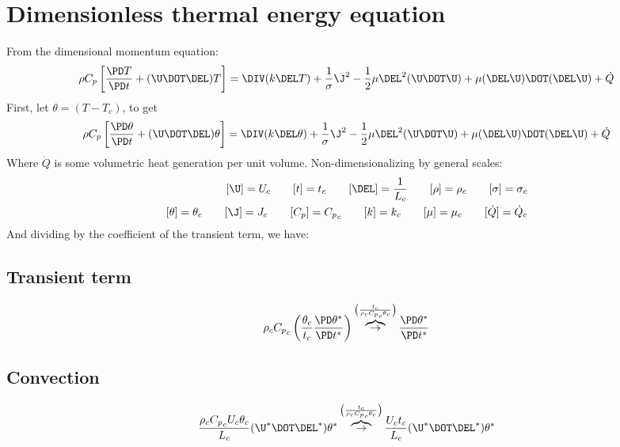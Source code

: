 \documentclass[11pt]{article}
\newcommand{\OB}{\overbrace{\rightarrow}^{\left(\frac{t_c}{\rho_c {C_p}_c \theta_c}\right)}}
\newcommand{\Cp}{{C_p}_c}
\begin{document}
\doublespacing
\MOONSTITLE
\maketitle

\section{Dimensionless thermal energy equation}
From the dimensional momentum equation:
\begin{equation}
	\rho C_p \left[ \frac{\PD T}{\PD t}
	+ (\U \DOT \DEL) T \right]
	= \DIV (k \DEL T)
	+ \frac{1}{\sigma} \J^2
	- \frac{1}{2} \mu \DEL^2 (\U \DOT \U)
	+ \mu (\DEL \U) \DOT (\DEL \U)
	+ \dot{Q}
\end{equation}
First, let $\theta = (T - T_c)$, to get
\begin{equation}
	\rho C_p \left[ \frac{\PD \theta}{\PD t}
	+ (\U \DOT \DEL) \theta \right]
	= \DIV (k \DEL \theta)
	+ \frac{1}{\sigma} \J^2
	- \frac{1}{2} \mu \DEL^2 (\U \DOT \U)
	+ \mu (\DEL \U) \DOT (\DEL \U)
	+ \dot{Q}
\end{equation}
Where $\dot{Q}$ is some volumetric heat generation per unit volume. Non-dimensionalizing by general scales:
\begin{equation}\begin{aligned}
	[\U] = U_c \qquad
	[t] = t_c \qquad
	[\DEL] = \frac{1}{L_c} \qquad
	[\rho] = \rho_c \qquad
	[\sigma] = \sigma_c \\
	[\theta] = \theta_c \qquad
	[\J] = J_c \qquad
	[C_p] = \Cp \qquad
	[k] = k_c \qquad
	[\mu] = \mu_c \qquad
	[\dot{Q}] = \dot{Q}_c
\end{aligned}\end{equation}
And dividing by the coefficient of the transient term, we have:
\subsection{Transient term}
\begin{equation}
	\rho_c \Cp \left( \frac{\theta_c}{t_c} \frac{\PD \theta^*}{\PD t^*} \right)
	\OB
	\frac{\PD \theta^*}{\PD t^*}
\end{equation}
\subsection{Convection}
\begin{equation}
	\frac{\rho_c \Cp U_c \theta_c}{L_c} (\U^* \DOT \DEL^*) \theta^*
	\OB
	\frac{U_c t_c}{L_c} (\U^* \DOT \DEL^*) \theta^*
\end{equation}
\end{document}
